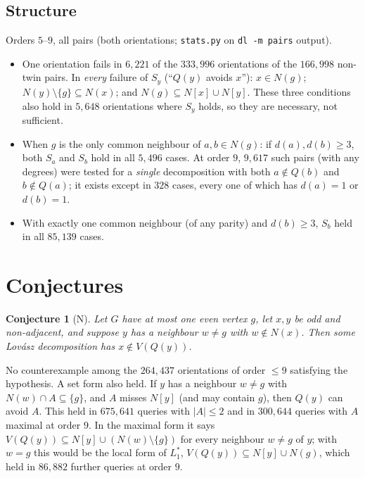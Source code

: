 \documentclass[11pt]{amsart}
\newtheorem{conjecture}[theorem]{Conjecture}
\theoremstyle{definition}
\begin{document}
\subsection*{Structure}
Orders $5$--$9$, all pairs (both orientations; \texttt{stats.py} on \texttt{dl -m pairs} output).
\begin{itemize}
\item One orientation fails in $6{,}221$ of the $333{,}996$ orientations of the $166{,}998$ non-twin pairs. In
\emph{every} failure of $S_y$ (``$Q(y)$ avoids $x$''): $x\in N(g)$; $N(y)\setminus\{g\}\subseteq
N(x)$; and $N(g)\subseteq N[x]\cup N[y]$. These three conditions also hold in $5{,}648$ orientations
where $S_y$ holds, so they are necessary, not sufficient.
\item When $g$ is the only common neighbour of $a,b\in N(g)$: if $d(a),d(b)\ge3$, both $S_a$ and $S_b$
hold in all $5{,}496$ cases. At order $9$, $9{,}617$ such pairs (with any degrees) were tested for a
\emph{single} decomposition with both $a\notin Q(b)$ and $b\notin Q(a)$; it exists except in $328$
cases, every one of which has $d(a)=1$ or $d(b)=1$.
\item With exactly one common neighbour (of any parity) and $d(b)\ge3$, $S_b$ held in all $85{,}139$
cases.
\end{itemize}

\section{Conjectures}\label{sec:conj}

\begin{conjecture}[N]\label{conj:n}
Let $G$ have at most one even vertex $g$, let $x,y$ be odd and non-adjacent, and suppose $y$ has a
neighbour $w\ne g$ with $w\notin N(x)$. Then some Lov\'asz decomposition has $x\notin V(Q(y))$.
\end{conjecture}

No counterexample among the $264{,}437$ orientations of order $\le9$ satisfying the hypothesis. A set
form also held. If $y$ has a neighbour $w\ne g$ with $N(w)\cap A\subseteq\{g\}$, and $A$ misses
$N[y]$ (and may contain $g$), then $Q(y)$ can avoid $A$. This held in $675{,}641$ queries with $|A|\le2$
and in $300{,}644$ queries with $A$ maximal at order $9$. In the maximal form it says
$V(Q(y))\subseteq N[y]\cup(N(w)\setminus\{g\})$ for every neighbour $w\ne g$ of $y$; with $w=g$ this
would be the local form of $L_1^*$, $V(Q(y))\subseteq N[y]\cup N(g)$, which held in $86{,}882$
further queries at order $9$.
\end{document}
